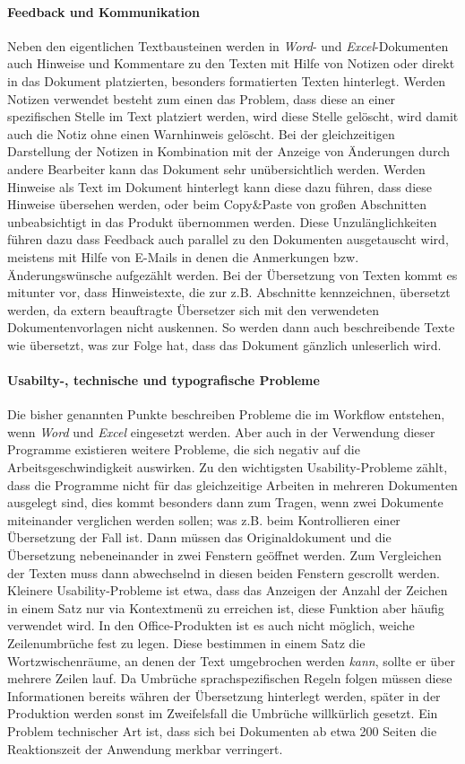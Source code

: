 \paragraph{Feedback und Kommunikation} Neben den eigentlichen Textbausteinen werden in \emph{Word}- und \emph{Excel}-Dokumenten auch Hinweise und Kommentare zu den Texten mit Hilfe von Notizen oder direkt in das Dokument platzierten, besonders formatierten Texten hinterlegt. Werden Notizen verwendet besteht zum einen das Problem, dass diese an einer spezifischen Stelle im Text platziert werden, wird diese Stelle gelöscht, wird damit auch die Notiz ohne einen Warnhinweis gelöscht. Bei der gleichzeitigen Darstellung der Notizen in Kombination mit der Anzeige von Änderungen durch andere Bearbeiter kann das Dokument sehr unübersichtlich werden. Werden Hinweise als Text im Dokument hinterlegt kann diese dazu führen, dass diese Hinweise übersehen werden, oder beim Copy\&Paste von großen Abschnitten unbeabsichtigt in das Produkt übernommen  werden. Diese Unzulänglichkeiten führen dazu dass Feedback auch parallel zu den Dokumenten ausgetauscht wird, meistens mit Hilfe von E-Mails in denen die Anmerkungen bzw. Änderungswünsche aufgezählt werden. Bei der Übersetzung von Texten kommt es mitunter vor, dass Hinweistexte, die zur z.B. Abschnitte kennzeichnen, übersetzt werden, da extern beauftragte Übersetzer sich mit den verwendeten Dokumentenvorlagen nicht auskennen. So werden dann auch beschreibende Texte wie  übersetzt, was zur Folge hat, dass das Dokument gänzlich unleserlich wird.

\paragraph{Usabilty-, technische und typografische Probleme} Die bisher genannten Punkte beschreiben Probleme die im Workflow entstehen, wenn \emph{Word} und \emph{Excel} eingesetzt werden. Aber auch in der Verwendung dieser Programme existieren weitere Probleme, die sich negativ auf die Arbeitsgeschwindigkeit auswirken. Zu den wichtigsten Usability-Probleme zählt, dass die Programme nicht für das gleichzeitige Arbeiten in mehreren Dokumenten ausgelegt sind, dies kommt besonders dann zum Tragen, wenn zwei Dokumente miteinander verglichen werden sollen; was z.B. beim Kontrollieren einer Übersetzung der Fall ist. Dann müssen das Originaldokument und die Übersetzung nebeneinander in zwei Fenstern geöffnet werden. Zum Vergleichen der Texten muss dann abwechselnd in diesen beiden Fenstern gescrollt werden. Kleinere Usability-Probleme ist etwa, dass das Anzeigen der Anzahl der Zeichen in einem Satz nur via Kontextmenü zu erreichen ist, diese Funktion aber häufig verwendet wird. In den Office-Produkten ist es auch nicht möglich, weiche Zeilenumbrüche fest zu legen. Diese bestimmen in einem Satz die Wortzwischenräume, an denen der Text umgebrochen werden \emph{kann}, sollte er über mehrere Zeilen lauf. Da Umbrüche sprachspezifischen Regeln folgen müssen diese Informationen bereits währen der Übersetzung hinterlegt werden, später in der Produktion werden sonst im Zweifelsfall die Umbrüche willkürlich gesetzt. Ein Problem technischer Art ist, dass sich bei Dokumenten ab etwa 200 Seiten die Reaktionszeit der Anwendung merkbar verringert.

